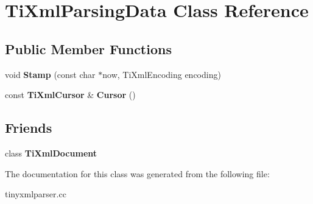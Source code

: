 \section{Ti\+Xml\+Parsing\+Data Class Reference}
\label{classTiXmlParsingData}
\subsection*{Public Member Functions}
\begin{DoxyCompactItemize}
\item 
\mbox{\label{classTiXmlParsingData_a65cee8ab77a36c605db08c84b4c30a7d}} 
void {\bfseries Stamp} (const char $\ast$now, Ti\+Xml\+Encoding encoding)
\item 
\mbox{\label{classTiXmlParsingData_a56908a17d7d7a6b2e511e62cf1d40d05}} 
const \textbf{ Ti\+Xml\+Cursor} \& {\bfseries Cursor} ()
\end{DoxyCompactItemize}
\subsection*{Friends}
\begin{DoxyCompactItemize}
\item 
\mbox{\label{classTiXmlParsingData_a173617f6dfe902cf484ce5552b950475}} 
class {\bfseries Ti\+Xml\+Document}
\end{DoxyCompactItemize}


The documentation for this class was generated from the following file\+:\begin{DoxyCompactItemize}
\item 
tinyxmlparser.\+cc\end{DoxyCompactItemize}
